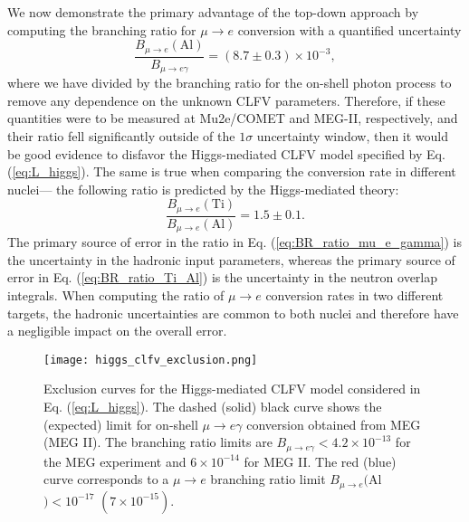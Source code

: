 \documentclass[12pt,letterpaper]{book}
\begin{document}
We now demonstrate the primary advantage of the top-down approach by computing the branching ratio for $\mu\rightarrow e$ conversion with a quantified uncertainty 
\begin{equation}
\frac{B_{\mu\rightarrow e}(\mathrm{Al})}{B_{\mu\rightarrow e\gamma}}=\left(8.7\pm 0.3\right)\times 10^{-3},
\label{eq:BR_ratio_mu_e_gamma}
\end{equation}
where we have divided by the branching ratio for the on-shell photon process to remove any dependence on the unknown CLFV parameters. Therefore, if these quantities were to be measured at Mu2e/COMET and MEG-II, respectively, and their ratio fell significantly outside of the $1\sigma$ uncertainty window, then it would be good evidence to disfavor the Higgs-mediated CLFV model specified by Eq. (\ref{eq:L_higgs}). The same is true when comparing the conversion rate in different nuclei--- the following ratio is predicted by the Higgs-mediated theory:
\begin{equation}
\frac{B_{\mu\rightarrow e}(\mathrm{Ti})}{B_{\mu\rightarrow e}(\mathrm{Al})}=1.5\pm 0.1.
\label{eq:BR_ratio_Ti_Al}
\end{equation}
The primary source of error in the ratio in Eq. (\ref{eq:BR_ratio_mu_e_gamma}) is the uncertainty in the hadronic input parameters, whereas the primary source of error in Eq. (\ref{eq:BR_ratio_Ti_Al}) is the uncertainty in the neutron overlap integrals. When computing the ratio of $\mu\rightarrow e$ conversion rates in two different targets, the hadronic uncertainties are common to both nuclei and therefore have a negligible impact on the overall error.
\begin{figure}
\centering
\texttt{[image: higgs\_clfv\_exclusion.png]}
\caption{Exclusion curves for the Higgs-mediated CLFV model considered in Eq. (\ref{eq:L_higgs}). The dashed (solid) black curve shows the (expected) limit for on-shell $\mu\rightarrow e\gamma$ conversion obtained from MEG (MEG II). The branching ratio limits are $B_{\mu\rightarrow e\gamma}<4.2\times 10^{-13}$ for the MEG experiment and $6\times 10^{-14}$ for MEG II. The red (blue) curve corresponds to a $\mu\rightarrow e$ branching ratio limit $B_{\mu\rightarrow e}($Al$)<10^{-17}$ $(7\times 10^{-15})$.}
\label{fig:higgs_clfv_exclusion}
\end{figure}
\end{document}
